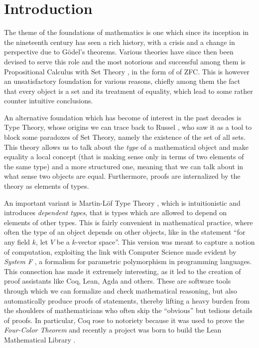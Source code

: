 \chapter*{Introduction}

The theme of the foundations of mathematics is one which since its inception in
the nineteenth century has seen a rich history, with a crisis and a change in
perspective due to G{\"o}del's theorems. Various theories have since then been
devised to serve this role and the most notorious and successful among them is
Propositional Calculus with
Set Theory \cite{Jec13}, in the form of of ZFC. This is however an
unsatisfactory foundation
for various reasons, chiefly among them the fact that every object is a set and
its treatment of equality, which lead to some rather counter intuitive
conclusions.

\noindent
An alternative foundation which has become of interest in the past decades is
Type Theory, whose origins we can trace back to Russel \cite{Rus08,RW97},
who saw it as a tool to
block some paradoxes of Set Theory,
namely the existence of the set of all sets. This theory allows us to talk about
the \emph{type} of a mathematical
object and make equality a local concept (that is making sense only in terms of
two elements of the same type) and a more structured one, meaning that we can
talk about in what sense two objects are equal. Furthermore, proofs are
internalized by the theory as elements of types.

\noindent
An important variant is Martin-L{\"o}f Type Theory \cite{ML84}, which is
intuitionistic and introduces \emph{dependent types}, that is types which are
allowed to depend on elements of other types. This is fairly convenient in
mathematical practice, where often the type of an object depends on other
objects, like in the statement ``for any field
$k$, let $V$ be a $k$-vector space''. This version was meant
to capture a notion of computation, exploiting the link with Computer Science
made evident by \emph{System F} \cite{Gir89}, a formalism for parametric
polymorphism in programming languages. This connection
has made it extremely interesting, as it led to the
creation of proof assistants like Coq, Lean, Agda and others. These are software
tools through which we can formalize and check mathematical reasoning, but also
automatically produce proofs of statements, thereby lifting a heavy burden from
the shoulders of mathematicians who often skip the ``obvious'' but tedious
details of proofs. In particular, Coq rose to notoriety because it was used to
prove the \emph{Four-Color Theorem} \cite{Gon08} and recently a project
was born to build the Lean Mathematical Library \cite{mat20}.

